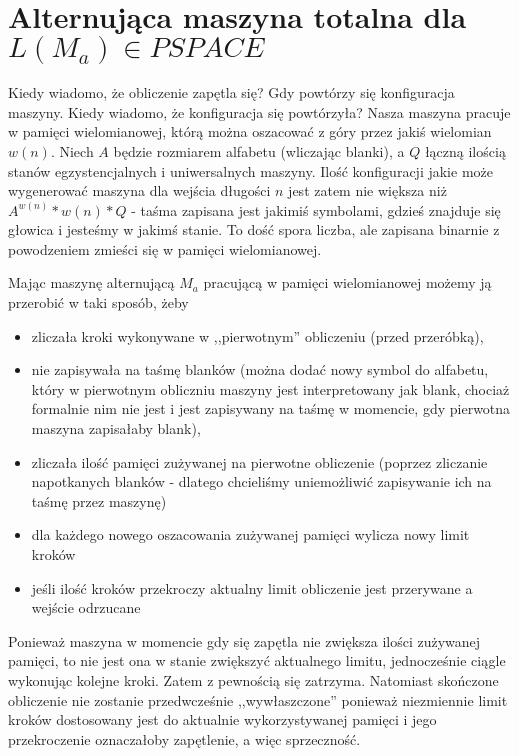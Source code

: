 \documentclass[a4paper,11pt]{article}
\begin{document}
\section*{Alternująca maszyna totalna dla $L(M_a) \in PSPACE$}

Kiedy wiadomo, że obliczenie zapętla się? Gdy powtórzy się konfiguracja maszyny.
Kiedy wiadomo, że konfiguracja się powtórzyła? Nasza maszyna pracuje w pamięci
wielomianowej, którą można oszacować z góry przez jakiś wielomian $w(n)$. Niech
$A$ będzie rozmiarem alfabetu (wliczając blanki), a $Q$ łączną ilością stanów
egzystencjalnych i uniwersalnych maszyny. Ilość konfiguracji jakie może
wygenerować maszyna dla wejścia długości $n$ jest zatem nie większa niż
$A^{w(n)} * w(n) * Q$ - taśma zapisana jest jakimiś symbolami, gdzieś znajduje
się głowica i jesteśmy w jakimś stanie. To dość spora liczba, ale zapisana
binarnie z powodzeniem zmieści się w pamięci wielomianowej.

Mając maszynę alternującą $M_a$ pracującą w pamięci wielomianowej możemy ją
przerobić w taki sposób, żeby
\begin{itemize}
  \item{zliczała kroki wykonywane w ,,pierwotnym'' obliczeniu (przed przeróbką),}
  \item{nie zapisywała na taśmę blanków (można dodać nowy symbol do alfabetu,
        który w pierwotnym obliczniu maszyny jest interpretowany jak blank,
        chociaż formalnie nim nie jest i jest zapisywany na taśmę w momencie,
        gdy pierwotna maszyna zapisałaby blank),}
  \item{zliczała ilość pamięci zużywanej na pierwotne obliczenie (poprzez
        zliczanie napotkanych blanków - dlatego chcieliśmy uniemożliwić
        zapisywanie ich na taśmę przez maszynę)}
  \item{dla każdego nowego oszacowania zużywanej pamięci wylicza nowy limit
        kroków}
  \item{jeśli ilość kroków przekroczy aktualny limit obliczenie jest przerywane a wejście
        odrzucane}
\end{itemize}
Ponieważ maszyna w momencie gdy się zapętla nie zwiększa ilości zużywanej
pamięci, to nie jest ona w stanie zwiększyć aktualnego limitu, jednocześnie
ciągle wykonując kolejne kroki. Zatem z pewnością się zatrzyma. Natomiast
skończone obliczenie nie zostanie przedwcześnie ,,wywłaszczone'' ponieważ
niezmiennie limit kroków dostosowany jest do aktualnie wykorzystywanej pamięci i
jego przekroczenie oznaczałoby zapętlenie, a więc sprzeczność. \\ \\
\end{document}
